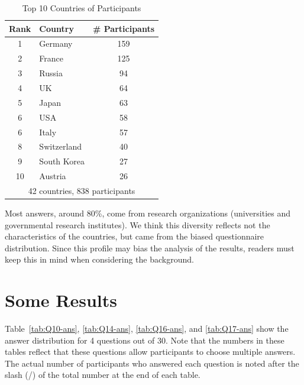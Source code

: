 \documentclass[sigconf,nonacm]{acmart}
\begin{document}
\begin{table}[htb]%
\begin{center}%
\caption{\small Top 10 Countries of Participants}
\vspace{-3mm}
\label{tab:countries}%
\begin{tabular}{c|l|c}%
\hline%
Rank & Country & \# Participants \\%
\hline%
1 & Germany 	& 159 \\%
2 & France 	& 125 \\%
3 & Russia 	& 94 \\%
4 & UK 		& 64 \\%
5 & Japan 	& 63 \\%
6 & USA 		& 58 \\%
6 & Italy 		& 57 \\%
\hline
8 & Switzerland & 40 \\%
9 & South Korea & 27 \\%
10 & Austria 	& 26  \\%
\hline%
\multicolumn{3}{c}{42 countries, 838 participants} \\%
\end{tabular}%
\end{center}%
\vspace{-5mm}
\end{table}%

Most answers, around 80\%, come from research organizations
(universities and governmental research institutes).  We think this
diversity reflects not the characteristics of the countries, but
came from the biased questionnaire distribution.
Since this profile may bias the analysis of the results,
readers must keep this in mind when considering the  background.

\section{Some Results}

Table~\ref{tab:Q10-ans}, \ref{tab:Q14-ans}, \ref{tab:Q16-ans}, and
\ref{tab:Q17-ans} show the answer distribution for 4 questions out of
30. Note that the numbers in these tables reflect that these questions allow participants to choose multiple answers.
The actual number of participants who answered
each question is noted after the slash (/) of the total number
at the end of each table.
\end{document}
